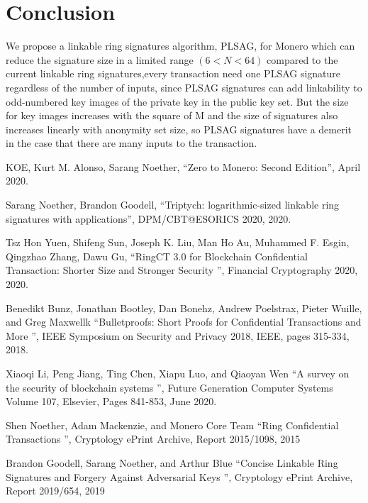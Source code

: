 \documentclass[letterpaper,10pt]{article}
\begin{document}
\section{Conclusion}
We propose a linkable ring signatures algorithm, PLSAG, for Monero which can reduce the signature size in a limited range $(6<N<64)$ compared to the current linkable ring signatures,every transaction need one PLSAG signature regardless of the number of inputs, since PLSAG signatures can add linkability to odd-numbered key images of the private key in the public key set. But the size for key images increases with the square of M and the size of signatures also increases linearly with anonymity set size, so PLSAG signatures have a demerit in the case that there are many inputs to the transaction.


\begin{thebibliography}{99} %

KOE, Kurt M. Alonso, Sarang Noether, 
\textquotedblleft Zero to Monero: Second Edition\textquotedblright, 
April 2020.

Sarang Noether, Brandon Goodell,
\textquotedblleft Triptych: logarithmic-sized linkable ring signatures with applications\textquotedblright, 
DPM/CBT@ESORICS 2020, 2020.

Tsz Hon Yuen, Shifeng Sun, Joseph K. Liu, Man Ho Au, Muhammed F. Esgin, Qingzhao Zhang, Dawu Gu,
\textquotedblleft RingCT 3.0 for Blockchain Confidential Transaction: Shorter Size and Stronger Security \textquotedblright, 
Financial Cryptography 2020, 2020.

Benedikt Bunz, Jonathan Bootley, Dan Bonehz, Andrew Poelstrax, Pieter Wuille, and Greg Maxwellk
\textquotedblleft Bulletproofs: Short Proofs for Confidential Transactions and More \textquotedblright, 
IEEE Symposium on Security and Privacy 2018, IEEE, pages 315-334, 2018.

Xiaoqi Li, Peng Jiang, Ting Chen, Xiapu Luo, and Qiaoyan Wen
\textquotedblleft A survey on the security of blockchain systems \textquotedblright, 
Future Generation Computer Systems Volume 107, Elsevier, Pages 841-853, June 2020.

Shen Noether, Adam Mackenzie, and Monero Core Team
\textquotedblleft Ring Confidential Transactions \textquotedblright, 
Cryptology ePrint Archive, Report 2015/1098, 2015

Brandon Goodell, Sarang Noether, and Arthur Blue
\textquotedblleft Concise Linkable Ring Signatures and Forgery Against Adversarial Keys \textquotedblright,
Cryptology ePrint Archive, Report 2019/654, 2019


\end{thebibliography}
\end{document}

